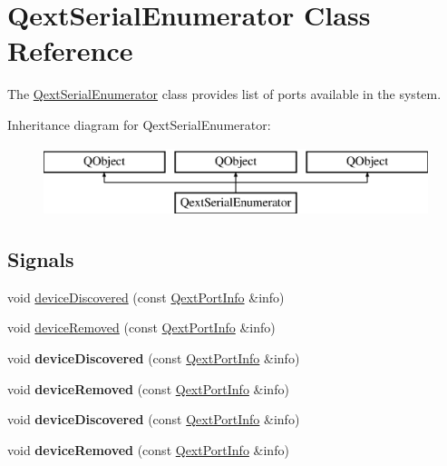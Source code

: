 \hypertarget{class_qext_serial_enumerator}{}\section{Qext\+Serial\+Enumerator Class Reference}
\label{class_qext_serial_enumerator}


The \mbox{\hyperlink{class_qext_serial_enumerator}{Qext\+Serial\+Enumerator}} class provides list of ports available in the system.  


Inheritance diagram for Qext\+Serial\+Enumerator\+:\begin{figure}[H]
\begin{center}
\leavevmode
\includegraphics[height=2.000000cm]{class_qext_serial_enumerator}
\end{center}
\end{figure}
\subsection*{Signals}
\begin{DoxyCompactItemize}
\item 
void \mbox{\hyperlink{class_qext_serial_enumerator_a843e343100c56975330e84dc0f291830}{device\+Discovered}} (const \mbox{\hyperlink{struct_qext_port_info}{Qext\+Port\+Info}} \&info)
\item 
void \mbox{\hyperlink{class_qext_serial_enumerator_a17bff0666e7ef9b812e165828b92938e}{device\+Removed}} (const \mbox{\hyperlink{struct_qext_port_info}{Qext\+Port\+Info}} \&info)
\item 
\mbox{\label{class_qext_serial_enumerator_a843e343100c56975330e84dc0f291830}} 
void {\bfseries device\+Discovered} (const \mbox{\hyperlink{struct_qext_port_info}{Qext\+Port\+Info}} \&info)
\item 
\mbox{\label{class_qext_serial_enumerator_a17bff0666e7ef9b812e165828b92938e}} 
void {\bfseries device\+Removed} (const \mbox{\hyperlink{struct_qext_port_info}{Qext\+Port\+Info}} \&info)
\item 
\mbox{\label{class_qext_serial_enumerator_a843e343100c56975330e84dc0f291830}} 
void {\bfseries device\+Discovered} (const \mbox{\hyperlink{struct_qext_port_info}{Qext\+Port\+Info}} \&info)
\item 
\mbox{\label{class_qext_serial_enumerator_a17bff0666e7ef9b812e165828b92938e}} 
void {\bfseries device\+Removed} (const \mbox{\hyperlink{struct_qext_port_info}{Qext\+Port\+Info}} \&info)
\end{DoxyCompactItemize}
